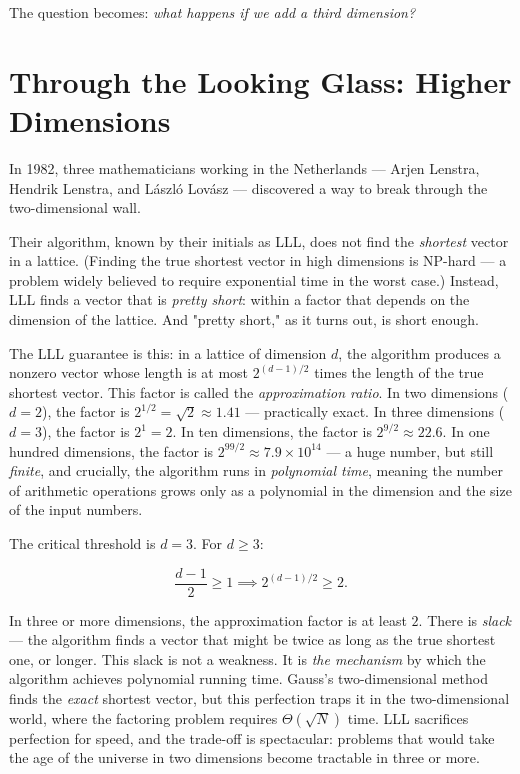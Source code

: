 The question becomes: \textit{what happens if we add a third dimension?}


\bigskip


\section{Through the Looking Glass: Higher Dimensions}

In 1982, three mathematicians working in the Netherlands --- Arjen Lenstra, Hendrik Lenstra, and L\'aszl\'o Lov\'asz --- discovered a way to break through the two-dimensional wall.

Their algorithm, known by their initials as LLL, does not find the \textit{shortest} vector in a lattice. (Finding the true shortest vector in high dimensions is NP-hard --- a problem widely believed to require exponential time in the worst case.) Instead, LLL finds a vector that is \textit{pretty short}: within a factor that depends on the dimension of the lattice. And "pretty short," as it turns out, is short enough.

The LLL guarantee is this: in a lattice of dimension $d$, the algorithm produces a nonzero vector whose length is at most $2^{(d-1)/2}$ times the length of the true shortest vector. This factor is called the \textit{approximation ratio}. In two dimensions ($d = 2$), the factor is $2^{1/2} = \sqrt{2} \approx 1.41$ --- practically exact. In three dimensions ($d = 3$), the factor is $2^1 = 2$. In ten dimensions, the factor is $2^{9/2} \approx 22.6$. In one hundred dimensions, the factor is $2^{99/2} \approx 7.9 \times 10^{14}$ --- a huge number, but still \textit{finite}, and crucially, the algorithm runs in \textit{polynomial time}, meaning the number of arithmetic operations grows only as a polynomial in the dimension and the size of the input numbers.

The critical threshold is $d = 3$. For $d \ge 3$:

\[
\frac{d-1}{2} \ge 1 \implies 2^{(d-1)/2} \ge 2.
\]

In three or more dimensions, the approximation factor is at least $2$. There is \textit{slack} --- the algorithm finds a vector that might be twice as long as the true shortest one, or longer. This slack is not a weakness. It is \textit{the mechanism} by which the algorithm achieves polynomial running time. Gauss's two-dimensional method finds the \textit{exact} shortest vector, but this perfection traps it in the two-dimensional world, where the factoring problem requires $\Theta(\sqrt{N})$ time. LLL sacrifices perfection for speed, and the trade-off is spectacular: problems that would take the age of the universe in two dimensions become tractable in three or more.

